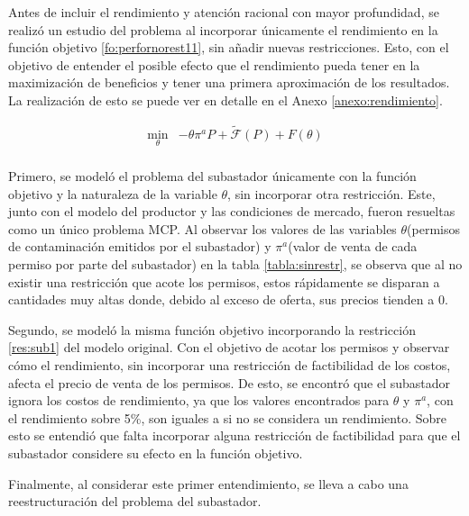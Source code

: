 Antes de incluir el rendimiento y atención racional con mayor profundidad, se realizó un estudio del problema al incorporar únicamente el rendimiento en la función objetivo \ref{fo:perfornorest11}, sin añadir nuevas restricciones. Esto, con el objetivo de entender el posible efecto que el rendimiento pueda tener en la maximización de beneficios y tener una primera aproximación de los resultados. La realización de esto se puede ver en detalle en el Anexo \ref{anexo:rendimiento}. 
\vspace{2.5mm}

\begin{equation}
\begin{array}{rrclcl}
    \displaystyle \min_{\theta} & -\theta \pi^aP + \tilde{\mathcal{F}}(P)+F(\theta)  \label{fo:perfornorest11}\\
\end{array}
\end{equation}

Primero, se modeló el problema del subastador únicamente con la función objetivo y la naturaleza de la variable $\theta$, sin incorporar otra restricción. Este, junto con el modelo del productor y las condiciones de mercado, fueron resueltas como un único problema MCP. Al observar los valores de las variables $\theta$(permisos de contaminación emitidos por el subastador) y $\pi^a$(valor de venta de cada permiso por parte del subastador) en la tabla \ref{tabla:sinrestr}, se observa que al no existir una restricción que acote los permisos, estos rápidamente se disparan a cantidades muy altas donde, debido al exceso de oferta, sus precios tienden a 0.
\vspace{2.5mm}

Segundo, se modeló la misma función objetivo incorporando la restricción \ref{res:sub1} del modelo original. Con el objetivo de acotar los permisos y observar cómo el rendimiento, sin incorporar una restricción de factibilidad de los costos, afecta el precio de venta de los permisos. De esto, se encontró que el subastador ignora los costos de rendimiento, ya que los valores encontrados para $\theta$ y  $\pi^a$, con el rendimiento sobre 5\%, son iguales a si no se considera un rendimiento. Sobre esto se entendió que falta incorporar alguna restricción de factibilidad para que el subastador considere su efecto en la función objetivo.
\vspace{2.5mm}

Finalmente, al considerar este primer entendimiento, se lleva a cabo una reestructuración del problema del subastador.


